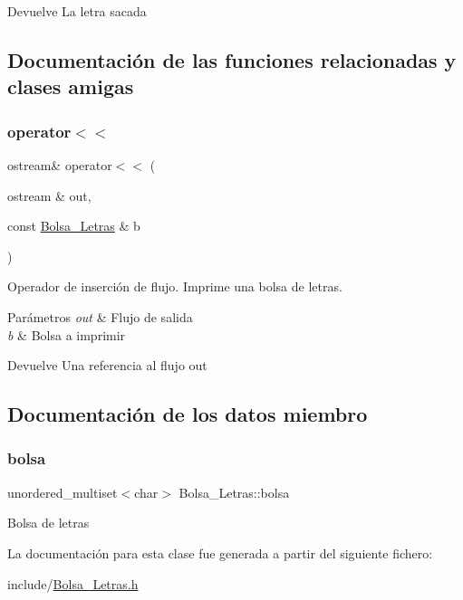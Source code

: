 \begin{DoxyReturn}{Devuelve}
La letra sacada 
\end{DoxyReturn}


\subsection{Documentación de las funciones relacionadas y clases amigas}
\mbox{\label{classBolsa__Letras_a61d5cc8910f22dbb655349218d33d874}} 
\subsubsection{\texorpdfstring{operator$<$$<$}{operator<<}}
{\footnotesize\ttfamily ostream\& operator$<$$<$ (\begin{DoxyParamCaption}\item[{ostream \&}]{out,  }\item[{const \hyperlink{classBolsa__Letras}{Bolsa\+\_\+\+Letras} \&}]{b }\end{DoxyParamCaption})\hspace{0.3cm}{\ttfamily [friend]}}



Operador de inserción de flujo. Imprime una bolsa de letras. 


\begin{DoxyParams}{Parámetros}
{\em out} & Flujo de salida \\
\hline
{\em b} & Bolsa a imprimir \\
\hline
\end{DoxyParams}
\begin{DoxyReturn}{Devuelve}
Una referencia al flujo out 
\end{DoxyReturn}


\subsection{Documentación de los datos miembro}
\mbox{\label{classBolsa__Letras_a758f691f0b50cfd6c35aa09b02b6e545}} 
\subsubsection{\texorpdfstring{bolsa}{bolsa}}
{\footnotesize\ttfamily unordered\+\_\+multiset$<$char$>$ Bolsa\+\_\+\+Letras\+::bolsa\hspace{0.3cm}{\ttfamily [private]}}

Bolsa de letras 

La documentación para esta clase fue generada a partir del siguiente fichero\+:\begin{DoxyCompactItemize}
\item 
include/\hyperlink{Bolsa__Letras_8h}{Bolsa\+\_\+\+Letras.\+h}\end{DoxyCompactItemize}
